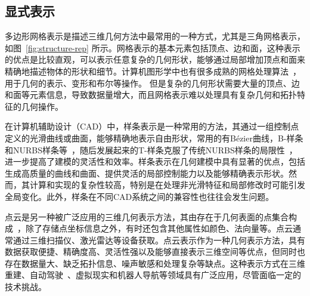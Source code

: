 \subsection{显式表示}
多边形网格表示是描述三维几何方法中最常用的一种方式，尤其是三角网格表示，如图~\ref{fig:structure-rep} 所示。网格表示的基本元素包括顶点、边和面，这种表示的优点是比较直观，可以表示任意复杂的几何形状，能够通过局部增加顶点和面来精确地描述物体的形状和细节。计算机图形学中也有很多成熟的网格处理算法~\cite{botsch2010polygon}，用于几何的表示、变形和布尔等操作。
但是复杂的几何形状需要大量的顶点、边和面等元素信息，导致数据量增大，而且网格表示难以处理具有复杂几何和拓扑特征的几何操作。

在计算机辅助设计（CAD）中，样条表示是一种常用的方法，其通过一组控制点定义的光滑曲线或曲面，能够精确地表示自由形状，常用的有B\'ezier曲线，B-样条和NURBS样条等~\cite{eck1996automatic,熊运阳2014cad}，随后发展起来的T-样条克服了传统NURBS样条的局限性~\cite{sederberg2003t,李新2008t}，进一步提高了建模的灵活性和效率。样条表示在几何建模中具有显著的优点，包括生成高质量的曲线和曲面、提供灵活的局部控制能力以及能够精确表示形状。然而，其计算和实现的复杂性较高，特别是在处理非光滑特征和局部修改时可能引发全局变化。此外，样条在不同CAD系统之间的兼容性也往往会发生问题。

点云是另一种被广泛应用的三维几何表示方法，其由存在于几何表面的点集合构成~\cite{杨必胜,ran2022surface}，除了存储点坐标信息之外，有时还包含其他属性如颜色、法向量等。点云通常通过三维扫描仪、激光雷达等设备获取。点云表示作为一种几何表示方法，具有数据获取便捷、精确度高、灵活性强以及能够直接表示三维空间等优点，但同时也存在数据量大、缺乏拓扑信息、噪声敏感和处理复杂等缺点。这种表示方式在三维重建、自动驾驶~\cite{cui2021deep}、虚拟现实和机器人导航等领域具有广泛应用，尽管面临一定的技术挑战。

